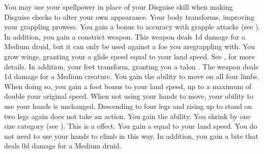         You may use your spellpower in place of your Disguise skill when making Disguise checks to alter your own appearance.
        Your body transforms, improving your grappling prowess.
        You gain a  bonus to accuracy with grapple attacks (see ).
        In addition, you gain a constrict weapon.
        This weapon deals \plus1d damage for a Medium druid, but it can only be used against a foe you aregrappling with.
        You grow wings, granting your a glide speed equal to your land speed.
        See , for more details.
        In addition, your feet transform, granting you a talon .
        The weapon deals \minus1d damage for a Medium creature.
        You gain the ability to move on all four limbs.
        When doing so, you gain a  foot bonus to your land speed, up to a maximum of double your original speed.
        When not using your hands to move, your ability to use your hands is unchanged.
        Descending to four legs and rising up to stand on two legs again does not take an action.
        You gain the  ability.
        You shrink by one size category (see ).
        This is a  effect.
        You gain a  equal to your land speed.
        You do not need to use your hands to climb in this way.
        In addition, you gain a bite  that deals \plus0d damage for a Medium druid.


